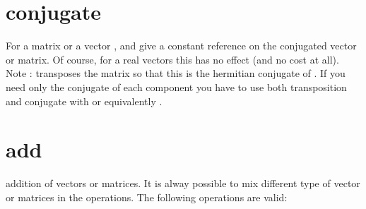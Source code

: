 \documentclass[a4paper,11pt,english]{sphinxmanual}
\begin{document}
\section{conjugate}
\label{\detokenize{gmm/blas:conjugate}}
\sphinxAtStartPar
For a matrix  or a vector ,
 and  give a constant reference on the conjugated vector or matrix. Of course, for a real vectors this has no effect (and no cost at all). Note :  transposes the matrix  so that this is the hermitian conjugate of . If you need only the conjugate of each component you have to use both transposition and conjugate with  or equivalently  .


\section{add}
\label{\detokenize{gmm/blas:add}}
\sphinxAtStartPar
addition of vectors or matrices. It is alway possible to mix different type of vector or matrices in the operations. The following operations are valid:
\end{document}
